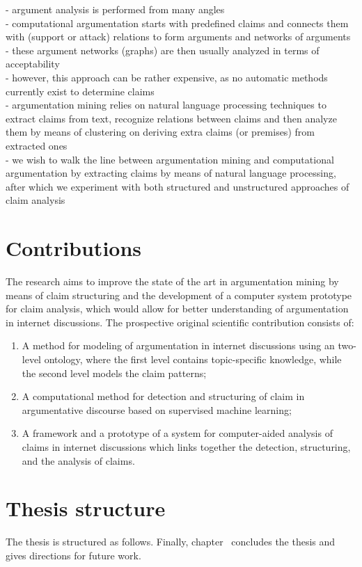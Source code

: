 - argument analysis is performed from many angles \\
- computational argumentation starts with predefined claims and connects them 
with (support or attack) relations to form arguments and networks of arguments \\
- these argument networks (graphs) are then usually analyzed in terms of acceptability \\
- however, this approach can be rather expensive, as no automatic methods currently exist
to determine claims \\
- argumentation mining relies on natural language processing techniques to
extract claims from text, recognize relations between claims and then analyze them
by means of clustering on deriving extra claims (or premises) from 
extracted ones \\
- we wish to walk the line between argumentation mining and computational argumentation 
by extracting claims by means of natural language processing, after which we 
experiment with both structured and unstructured approaches of claim analysis \\

\section{Contributions}

The research aims to improve the state of
the art in argumentation mining by means of claim structuring and the
development of a computer system prototype for claim analysis, which would
allow for better understanding of argumentation in internet discussions. 
The prospective original scientific contribution consists of: 
\begin{enumerate}
\item A method for modeling of argumentation in internet discussions using an
two-level ontology, where the first level contains topic-specific knowledge,
while the second level models the claim patterns;
\item A computational method for detection and
structuring of claim in argumentative discourse based on supervised machine
learning;
\item A framework and a prototype of a system for computer-aided
analysis of claims in internet discussions which links together the detection,
structuring, and the analysis of claims.  
\end{enumerate}

\section{Thesis structure}

The thesis is structured as follows. Finally, chapter~
concludes the thesis and gives directions for future work. 
